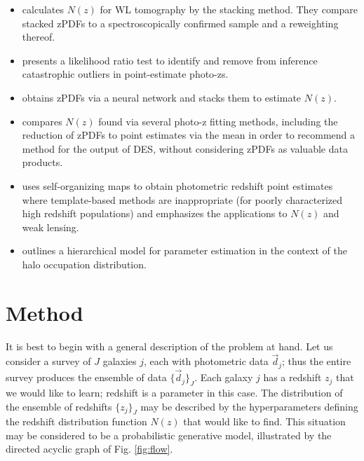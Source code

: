 \documentclass[preprint]{aastex}
\begin{document}
\begin{itemize}
\item \citet{ben12} calculates $N(z)$ for WL tomography by the stacking method.  They compare stacked zPDFs to a spectroscopically confirmed sample and a reweighting thereof.
\item \citet{gor13} presents a likelihood ratio test to identify and remove from inference catastrophic outliers in point-estimate photo-zs.
\item \citet{bon13} obtains zPDFs via a neural network and stacks them to estimate $N(z)$.
\item \citet{bon15} compares $N(z)$ found via several photo-z fitting methods, including the reduction of zPDFs to point estimates via the mean in order to recommend a method for the output of DES, without considering zPDFs as valuable data products.
\item \citet{mas15} uses self-organizing maps to obtain photometric redshift point estimates where template-based methods are inappropriate (for poorly characterized high redshift populations) and emphasizes the applications to $N(z)$ and weak lensing.
\item \citet{mar15} outlines a hierarchical model for parameter estimation in the context of the halo occupation distribution.
\end{itemize}

\clearpage
\section{Method}
\label{sec:meth}

It is best to begin with a general description of the problem at hand.  Let us consider a survey of $J$ galaxies $j$, each with photometric data $\vec{d}_{j}$; thus the entire survey produces the ensemble of data $\{\vec{d}_{j}\}_{J}$.  Each galaxy $j$ has a redshift $z_{j}$ that we would like to learn; redshift is a parameter in this case.  The distribution of the ensemble of redshifts $\{z_{j}\}_{J}$ may be described by the hyperparameters defining the redshift distribution function $N(z)$ that would like to find.  This situation may be considered to be a probabilistic generative model, illustrated by the directed acyclic graph of Fig. \ref{fig:flow}.  
\end{document}
